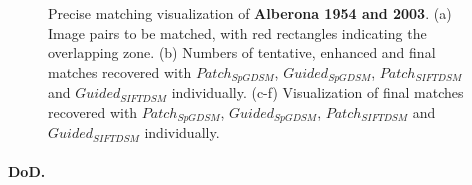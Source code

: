 \begin{figure}[htbp]
\begin{center}
{\begin{minipage}[t]{0.48\linewidth}
			\end{minipage}%
		}
		\caption{Precise matching visualization of \textbf{Alberona 1954 and 2003}. (a) Image pairs to be matched, with red rectangles indicating the overlapping zone. (b) Numbers of tentative, enhanced and final matches recovered with $Patch_{SpGDSM}$, $Guided_{SpGDSM}$, $Patch_{SIFTDSM}$ and $Guided_{SIFTDSM}$ individually. (c-f) Visualization of final matches recovered with $Patch_{SpGDSM}$, $Guided_{SpGDSM}$, $Patch_{SIFTDSM}$ and $Guided_{SIFTDSM}$ individually.}
		\label{MatchVizAlberona}
	\end{center}
\end{figure} 


\paragraph{\ac{DoD}.}

